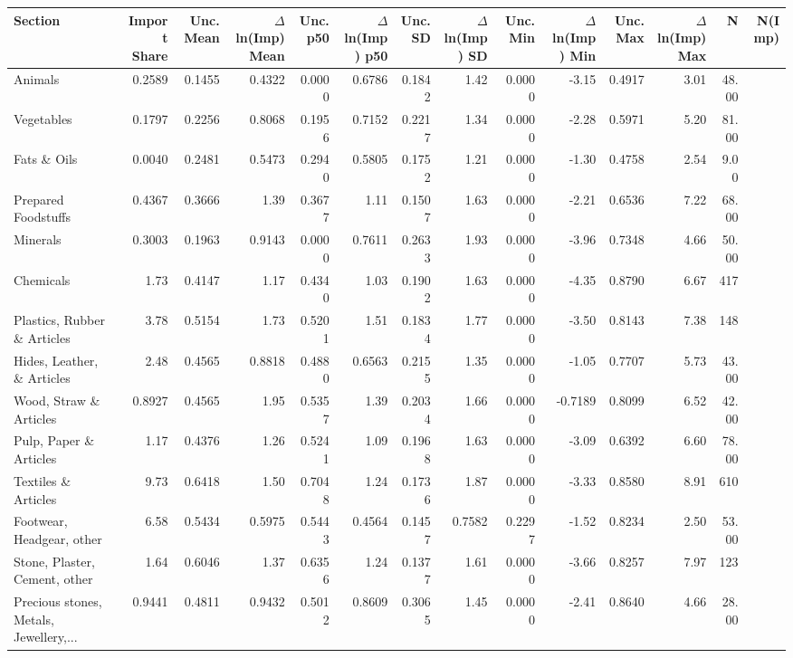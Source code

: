 {\scriptsize
\begin{tabular}{lrrrrrrrrrrrrr}
\toprule
Section & Import Share & Unc. Mean & $\Delta$ln(Imp) Mean & Unc. p50 & $\Delta$ln(Imp) p50 & Unc. SD & $\Delta$ln(Imp) SD & Unc. Min & $\Delta$ln(Imp) Min & Unc. Max & $\Delta$ln(Imp) Max & N & N(Imp) \\
\midrule
Animals & 0.2589 & 0.1455 & 0.4322 & 0.0000 & 0.6786 & 0.1842 & 1.42 & 0.0000 & -3.15 & 0.4917 & 3.01 & 48.00 &  \\
Vegetables & 0.1797 & 0.2256 & 0.8068 & 0.1956 & 0.7152 & 0.2217 & 1.34 & 0.0000 & -2.28 & 0.5971 & 5.20 & 81.00 &  \\
Fats \& Oils & 0.0040 & 0.2481 & 0.5473 & 0.2940 & 0.5805 & 0.1752 & 1.21 & 0.0000 & -1.30 & 0.4758 & 2.54 & 9.00 &  \\
Prepared Foodstuffs & 0.4367 & 0.3666 & 1.39 & 0.3677 & 1.11 & 0.1507 & 1.63 & 0.0000 & -2.21 & 0.6536 & 7.22 & 68.00 &  \\
Minerals & 0.3003 & 0.1963 & 0.9143 & 0.0000 & 0.7611 & 0.2633 & 1.93 & 0.0000 & -3.96 & 0.7348 & 4.66 & 50.00 &  \\
Chemicals & 1.73 & 0.4147 & 1.17 & 0.4340 & 1.03 & 0.1902 & 1.63 & 0.0000 & -4.35 & 0.8790 & 6.67 & 417 &  \\
Plastics, Rubber \& Articles & 3.78 & 0.5154 & 1.73 & 0.5201 & 1.51 & 0.1834 & 1.77 & 0.0000 & -3.50 & 0.8143 & 7.38 & 148 &  \\
Hides, Leather, \& Articles & 2.48 & 0.4565 & 0.8818 & 0.4880 & 0.6563 & 0.2155 & 1.35 & 0.0000 & -1.05 & 0.7707 & 5.73 & 43.00 &  \\
Wood, Straw \& Articles & 0.8927 & 0.4565 & 1.95 & 0.5357 & 1.39 & 0.2034 & 1.66 & 0.0000 & -0.7189 & 0.8099 & 6.52 & 42.00 &  \\
Pulp, Paper \& Articles & 1.17 & 0.4376 & 1.26 & 0.5241 & 1.09 & 0.1968 & 1.63 & 0.0000 & -3.09 & 0.6392 & 6.60 & 78.00 &  \\
Textiles \& Articles & 9.73 & 0.6418 & 1.50 & 0.7048 & 1.24 & 0.1736 & 1.87 & 0.0000 & -3.33 & 0.8580 & 8.91 & 610 &  \\
Footwear, Headgear, other & 6.58 & 0.5434 & 0.5975 & 0.5443 & 0.4564 & 0.1457 & 0.7582 & 0.2297 & -1.52 & 0.8234 & 2.50 & 53.00 &  \\
Stone, Plaster, Cement, other & 1.64 & 0.6046 & 1.37 & 0.6356 & 1.24 & 0.1377 & 1.61 & 0.0000 & -3.66 & 0.8257 & 7.97 & 123 &  \\
Precious stones, Metals, Jewellery,... & 0.9441 & 0.4811 & 0.9432 & 0.5012 & 0.8609 & 0.3065 & 1.45 & 0.0000 & -2.41 & 0.8640 & 4.66 & 28.00 &  \\

\end{tabular}}

